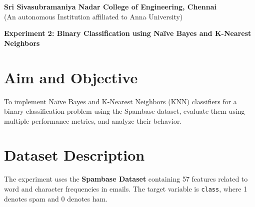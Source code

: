 \documentclass[11pt]{article}
\begin{document}
\begin{center}
    \large \textbf{Sri Sivasubramaniya Nadar College of Engineering, Chennai} \\
    (An autonomous Institution affiliated to Anna University) \\
    \vspace{0.3cm}
\end{center}

\begin{table}[!h]
\renewcommand{\arraystretch}{1.5}
\end{table}

\begin{center}
\textbf{Experiment 2: Binary Classification using Na\"ive Bayes and K-Nearest Neighbors}
\end{center}

\section{Aim and Objective}
To implement Na\"ive Bayes and K-Nearest Neighbors (KNN) classifiers for a binary classification problem using the Spambase dataset, evaluate them using multiple performance metrics, and analyze their behavior.

\section{Dataset Description}
The experiment uses the \textbf{Spambase Dataset} containing 57 features related to word and character frequencies in emails. The target variable is \texttt{class}, where 1 denotes spam and 0 denotes ham.

\end{document}

